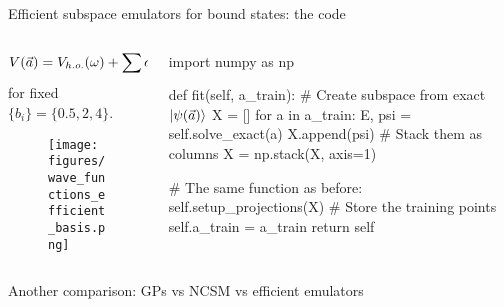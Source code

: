 \documentclass[xcolor=dvipsnames, aspectratio=169]{beamer}
\begin{document}
\begin{frame}{Efficient subspace emulators for bound states: the code}

\begin{columns}[t]
\begin{column}{0.5\textwidth}
\vspace{-0.5cm}%
\begin{align*}
    V(\vec{a}) = V_{h.o.}(\omega) + \sum a_i \exp[-(r/b_i)^2]
\end{align*}
for fixed $\{b_i\} = \{0.5, 2, 4\}$.
\vspace{-0.1cm}
\begin{figure}
\texttt{[image: figures/wave\_functions\_efficient\_basis.png]}
\end{figure}
\end{column}
\begin{column}{0.57\textwidth}
\begin{python}[]
import numpy as np

def fit(self, a_train):
    # Create subspace from exact $\ket{\psi(\vec{a})}$
    X = []
    for a in a_train:
        E, psi = self.solve_exact(a)
        X.append(psi)
    # Stack them as columns
    X = np.stack(X, axis=1)

    # The same function as before:
    self.setup_projections(X)
    # Store the training points
    self.a_train = a_train
    return self
\end{python}
\end{column}
\end{columns}
\end{frame}


\begin{frame}[t]{Another comparison: GPs vs NCSM vs efficient emulators}
\begin{columns}
\begin{column}{0.5\textwidth}

\end{column}
\begin{column}{0.5\textwidth}
\end{column}
\end{columns}

\begin{center}\vspace{-1cm}
\end{center}
\end{frame}
\end{document}
